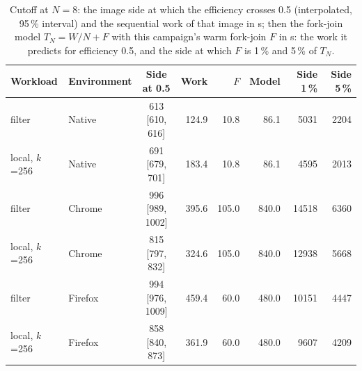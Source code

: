 \begin{table}[htbp]
\caption{Cutoff at $N=8$: the image side at which the efficiency crosses 0.5 (interpolated, 95\,\% interval) and the sequential work of that image in \textmu s; then the fork-join model $T_N=W/N+F$ with this campaign's warm fork-join $F$ in \textmu s: the work it predicts for efficiency 0.5, and the side at which $F$ is 1\,\% and 5\,\% of $T_N$.}\label{tab:cutoff-estimates}
\centering\footnotesize
\begin{tabular}{llcrrrrr}
\toprule
Workload & Environment & Side at 0.5 & Work & $F$ & Model & Side 1\,\% & Side 5\,\% \\
\midrule
filter & Native & 613 [610, 616] & 124.9 & 10.8 & 86.1 & 5031 & 2204 \\
local, $k$=256 & Native & 691 [679, 701] & 183.4 & 10.8 & 86.1 & 4595 & 2013 \\
filter & Chrome & 996 [989, 1002] & 395.6 & 105.0 & 840.0 & 14518 & 6360 \\
local, $k$=256 & Chrome & 815 [797, 832] & 324.6 & 105.0 & 840.0 & 12938 & 5668 \\
filter & Firefox & 994 [976, 1009] & 459.4 & 60.0 & 480.0 & 10151 & 4447 \\
local, $k$=256 & Firefox & 858 [840, 873] & 361.9 & 60.0 & 480.0 & 9607 & 4209 \\
\bottomrule
\end{tabular}
\end{table}

